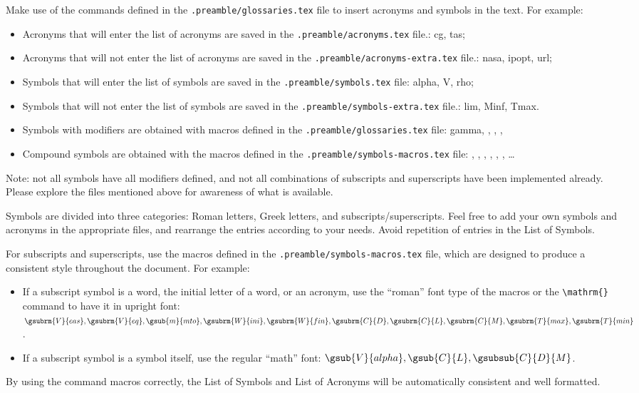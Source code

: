 Make use of the commands defined in the \texttt{.preamble/glossaries.tex} file to insert acronyms and symbols in the text.
For example:
\begin{itemize}
    \item Acronyms that will enter the list of acronyms are saved in the \texttt{.preamble/acronyms.tex} file.: \gls{cg}, \gls{tas};
    \item Acronyms that will not enter the list of acronyms are saved in the \texttt{.preamble/acronyms-extra.tex} file.: \gls{nasa}, \gls{ipopt}, \gls{url};
    \item Symbols that will enter the list of symbols are saved in the \texttt{.preamble/symbols.tex} file: \gls{alpha}, \gls{V}, \gls{rho};
    \item Symbols that will not enter the list of symbols are saved in the \texttt{.preamble/symbols-extra.tex} file.: \gls{lim}, \gls{Minf}, \gls{Tmax}.
    \item Symbols with modifiers are obtained with macros defined in the \texttt{.preamble/glossaries.tex} file: \gls{gamma}, , , , 
    \item Compound symbols are obtained with the macros defined in the \texttt{.preamble/symbols-macros.tex} file: , , , , , , \ldots
\end{itemize}
%
Note: not all symbols have all modifiers defined, and not all combinations of subscripts and superscripts have been implemented already.
Please explore the files mentioned above for awareness of what is available.


Symbols are divided into three categories: Roman letters, Greek letters, and subscripts/superscripts.
Feel free to add your own symbols and acronyms in the appropriate files, and rearrange the entries according to your needs.
Avoid repetition of entries in the List of Symbols.

For subscripts and superscripts, use the macros defined in the \texttt{.preamble/symbols-macros.tex} file, which are designed to produce a consistent style throughout the document.
For example:
\begin{itemize}
    \item If a subscript symbol is a word, the initial letter of a word, or an acronym, use the ``roman'' font type of the macros or the \texttt{\textbackslash{}mathrm\{\}} command to have it in upright font: $\gsubrm{V}{eas}, \gsubrm{V}{eq}, \gsub{m}{mto}, \gsubrm{W}{ini}, \gsubrm{W}{fin}, \gsubrm{C}{D}, \gsubrm{C}{L}, \gsubrm{C}{M}, \gsubrm{T}{max}, \gsubrm{T}{min}$.
    \item If a subscript symbol is a symbol itself, use the regular ``math'' font: $\gsub{V}{alpha}, \gsub{C}{L}, \gsubsub{C}{D}{M}$.
\end{itemize}
%
By using the command macros correctly, the List of Symbols and List of Acronyms will be automatically consistent and well formatted.

